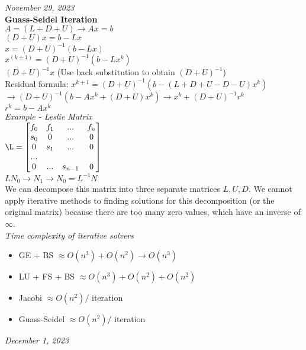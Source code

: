 \documentclass[10pt, AMS Euler]{article}
\begin{document}
\textit{November 29, 2023}\\

\textbf{Guass-Seidel Iteration}\\
$A = (L + D + U) \rightarrow Ax = b$\\
$(D + U) x = b - L x$\\
$x = (D + U)^{-1} (b - L x)$\\
$x^{(k+1)} = (D + U)^{-1} (b - Lx^k)$\\
$(D + U)^{-1} x$ (Use back substitution to obtain $(D + U)^{-1}$)\\
Residual formula: $x^{k+1} = (D + U)^{-1} (b - (L + D + U - D - U) x^k)$\\
$\rightarrow (D + U)^{-1} (b - Ax^k + (D + U)x^k) \rightarrow x^k + (D + U)^{-1} r^k$\\
$r^k = b - Ax^k$\\

\textit{Example - Leslie Matrix}\\
$\L =
\begin{bmatrix}
  f_0 & f_1 & ... & f_n\\
  s_0 & 0 & ... & 0\\
  0 & s_1 & ... & 0\\
  ...\\
  0 & ... & s_{n-1} & 0\\
\end{bmatrix}\\
$\\
$LN_0 \rightarrow N_1 \rightarrow N_0 = L^{-1} N $\\
We can decompose this matrix into three separate matrices $L, U, D$. We cannot apply iterative methods to finding solutions for this decomposition (or the original matrix) because there are too many zero values, which have an inverse of $\infty$.\\

\textit{Time complexity of iterative solvers}
\begin{itemize}
  \item GE + BS $\approx O(n^3) + O(n^2) \rightarrow O(n^3)$
  \item LU + FS + BS $\approx O(n^3) + O(n^2) + O(n^2)$
  \item Jacobi $\approx O(n^2) /$ iteration
  \item Guass-Seidel $\approx O(n^2) /$ iteration
\end{itemize}

\textit{December 1, 2023}\\
\end{document}
